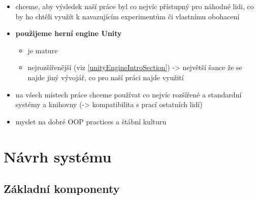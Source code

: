 \begin{itemize}
    \item chceme, aby výsledek naší práce byl co nejvíc přístupný pro náhodné lidi, co by ho chtěli využít k navazujícím experimentům či vlastnímu obohacení
    \item \textbf{použijeme herní engine Unity}
        \begin{itemize}
            \item je mature
            \item nejrozšířenější (viz \ref{unityEngineIntroSection}) -> největší šance že se najde jiný vývojář, co pro naší práci najde využití
        \end{itemize}
    \item na všech místech práce chceme používat co nejvíc rozšířené a standardní systémy a knihovny (-> kompatibilita s prací ostatních lidí)
    \item myslet na dobré OOP practices a štábní kulturu
\end{itemize}



\section{Návrh systému}

\subsection{Základní komponenty}

